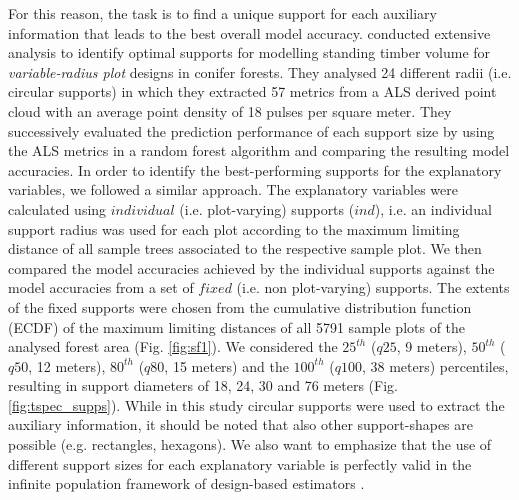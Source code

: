 For this reason, the task is to find a unique support for each auxiliary information that leads to the best overall model accuracy. \citet{deo2016} conducted extensive analysis to identify optimal supports for modelling standing timber volume for \textit{variable-radius plot} designs in conifer forests. They analysed 24 different radii (i.e. circular supports) in which they extracted 57 metrics from a ALS derived point cloud with an average point density of 18 pulses per square meter. They successively evaluated the prediction performance of each support size by using the ALS metrics in a random forest algorithm and comparing the resulting model accuracies. In order to identify the best-performing supports for the explanatory variables, we followed a similar approach. The explanatory variables were calculated using $individual$ (i.e. plot-varying) supports ($ind$), i.e. an individual support radius was used for each plot according to the maximum limiting distance of all sample trees associated to the respective sample plot. We then compared the model accuracies achieved by the individual supports against the model accuracies from a set of $fixed$ (i.e. non plot-varying) supports. The extents of the fixed supports were chosen from the cumulative distribution function (ECDF) of the maximum limiting distances of all 5791 sample plots of the analysed forest area (Fig. \ref{fig:sf1}). We considered the $25^{th}$ ($q25$, 9 meters), $50^{th}$ ($q50$, 12 meters), $80^{th}$ ($q80$, 15 meters) and the $100^{th}$ ($q100$, 38 meters) percentiles, resulting in support diameters of 18, 24, 30 and 76 meters (Fig. \ref{fig:tspec_supps}). While in this study circular supports were used to extract the auxiliary information, it should be noted that also other support-shapes are possible (e.g. rectangles, hexagons). We also want to emphasize that the use of different support sizes for each explanatory variable is perfectly valid in the infinite population framework of design-based estimators \citep{mandallaz2013c, mandallaz2013a}.



